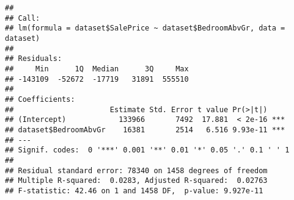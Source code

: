 \documentclass[
]{article}
\newenvironment{Shaded}{\begin{snugshade}}{\end{snugshade}}
\newcommand{\DecValTok}[1]{\textcolor[rgb]{0.00,0.00,0.81}{#1}}
\newcommand{\FloatTok}[1]{\textcolor[rgb]{0.00,0.00,0.81}{#1}}
\newcommand{\FunctionTok}[1]{\textcolor[rgb]{0.00,0.00,0.00}{#1}}
\newcommand{\NormalTok}[1]{#1}
\newcommand{\OtherTok}[1]{\textcolor[rgb]{0.56,0.35,0.01}{#1}}
\newcommand{\SpecialCharTok}[1]{\textcolor[rgb]{0.00,0.00,0.00}{#1}}
\begin{document}
\begin{verbatim}
## 
## Call:
## lm(formula = dataset$SalePrice ~ dataset$BedroomAbvGr, data = dataset)
## 
## Residuals:
##     Min      1Q  Median      3Q     Max 
## -143109  -52672  -17719   31891  555510 
## 
## Coefficients:
##                      Estimate Std. Error t value Pr(>|t|)    
## (Intercept)            133966       7492  17.881  < 2e-16 ***
## dataset$BedroomAbvGr    16381       2514   6.516 9.93e-11 ***
## ---
## Signif. codes:  0 '***' 0.001 '**' 0.01 '*' 0.05 '.' 0.1 ' ' 1
## 
## Residual standard error: 78340 on 1458 degrees of freedom
## Multiple R-squared:  0.0283, Adjusted R-squared:  0.02763 
## F-statistic: 42.46 on 1 and 1458 DF,  p-value: 9.927e-11
\end{verbatim}

\begin{Shaded}
\end{Shaded}
\end{document}
